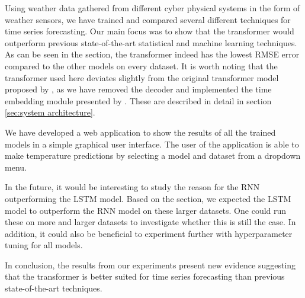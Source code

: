 Using weather data gathered from different cyber physical systems in the form of weather sensors, we have trained and compared several different techniques for time series forecasting.
Our main focus was to show that the transformer would outperform previous state-of-the-art statistical and machine learning techniques.
As can be seen in the  section, the transformer indeed has the lowest RMSE error compared to the other models on every dataset. 
It is worth noting that the transformer used here deviates slightly from the original transformer model proposed by \citet{AttentionIsAllYouNeed}, as we have removed the decoder and implemented the time embedding module presented by \citet{time2vec}.
These are described in detail in section \ref{sec:system architecture}.

We have developed a web application to show the results of all the trained models in a simple graphical user interface. 
The user of the application is able to make temperature predictions by selecting a model and dataset from a dropdown menu. 

In the future, it would be interesting to study the reason for the RNN outperforming the LSTM model.
Based on the  section, we expected the LSTM model to outperform the RNN model on these larger datasets.
One could run these on more and larger datasets to investigate whether this is still the case. 
In addition, it could also be beneficial to experiment further with hyperparameter tuning for all models.

In conclusion, the results from our experiments present new evidence suggesting that the transformer is better suited for time series forecasting than previous state-of-the-art techniques.